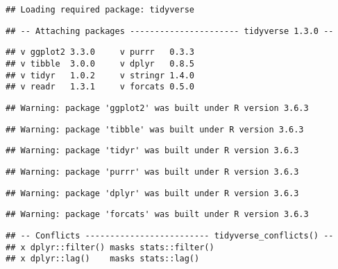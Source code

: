 \documentclass[
]{book}
\newenvironment{Shaded}{\begin{snugshade}}{\end{snugshade}}
\newcommand{\DataTypeTok}[1]{\textcolor[rgb]{0.13,0.29,0.53}{#1}}
\newcommand{\KeywordTok}[1]{\textcolor[rgb]{0.13,0.29,0.53}{\textbf{#1}}}
\newcommand{\NormalTok}[1]{#1}
\newcommand{\OperatorTok}[1]{\textcolor[rgb]{0.81,0.36,0.00}{\textbf{#1}}}
\newcommand{\OtherTok}[1]{\textcolor[rgb]{0.56,0.35,0.01}{#1}}
\newcommand{\StringTok}[1]{\textcolor[rgb]{0.31,0.60,0.02}{#1}}
\begin{document}
\begin{verbatim}
## Loading required package: tidyverse
\end{verbatim}

\begin{verbatim}
## -- Attaching packages ---------------------- tidyverse 1.3.0 --
\end{verbatim}

\begin{verbatim}
## v ggplot2 3.3.0     v purrr   0.3.3
## v tibble  3.0.0     v dplyr   0.8.5
## v tidyr   1.0.2     v stringr 1.4.0
## v readr   1.3.1     v forcats 0.5.0
\end{verbatim}

\begin{verbatim}
## Warning: package 'ggplot2' was built under R version 3.6.3
\end{verbatim}

\begin{verbatim}
## Warning: package 'tibble' was built under R version 3.6.3
\end{verbatim}

\begin{verbatim}
## Warning: package 'tidyr' was built under R version 3.6.3
\end{verbatim}

\begin{verbatim}
## Warning: package 'purrr' was built under R version 3.6.3
\end{verbatim}

\begin{verbatim}
## Warning: package 'dplyr' was built under R version 3.6.3
\end{verbatim}

\begin{verbatim}
## Warning: package 'forcats' was built under R version 3.6.3
\end{verbatim}

\begin{verbatim}
## -- Conflicts ------------------------- tidyverse_conflicts() --
## x dplyr::filter() masks stats::filter()
## x dplyr::lag()    masks stats::lag()
\end{verbatim}

\begin{Shaded}
\end{Shaded}
\end{document}
